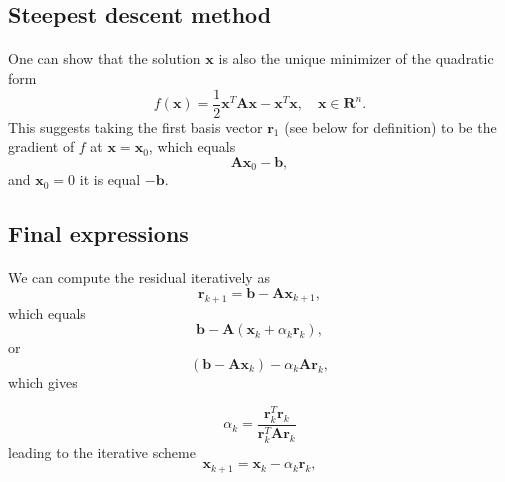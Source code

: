 \documentclass[%
oneside,                 %
final,                   %
10pt]{article}
\begin{document}
\subsection{Steepest descent  method}

\paragraph{}
One can show that the solution $\bm{x}$ is also the unique minimizer of the quadratic form
\begin{equation*}
  f(\bm{x}) = \frac{1}{2}\bm{x}^T\bm{A}\bm{x} - \bm{x}^T \bm{x} , \quad \bm{x}\in\mathbf{R}^n. 
\end{equation*}
This suggests taking the first basis vector $\bm{r}_1$ (see below for definition) 
to be the gradient of $f$ at $\bm{x}=\bm{x}_0$, 
which equals
\begin{equation*}
\bm{A}\bm{x}_0-\bm{b},
\end{equation*}
and 
$\bm{x}_0=0$ it is equal $-\bm{b}$.



\subsection{Final expressions}

\paragraph{}
We can compute the residual iteratively as
\begin{equation*}
\bm{r}_{k+1}=\bm{b}-\bm{A}\bm{x}_{k+1},
 \end{equation*}
which equals
\begin{equation*}
\bm{b}-\bm{A}(\bm{x}_k+\alpha_k\bm{r}_k),
 \end{equation*}
or
\begin{equation*}
(\bm{b}-\bm{A}\bm{x}_k)-\alpha_k\bm{A}\bm{r}_k,
 \end{equation*}
which gives

\[
\alpha_k = \frac{\bm{r}_k^T\bm{r}_k}{\bm{r}_k^T\bm{A}\bm{r}_k}
\]
leading to the iterative scheme
\begin{equation*}
\bm{x}_{k+1}=\bm{x}_k-\alpha_k\bm{r}_{k},
 \end{equation*}
\end{document}
